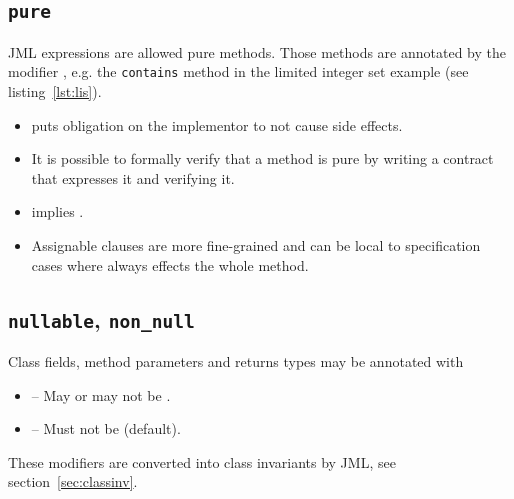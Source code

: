 		\subsection{\texttt{pure}}
		
			JML expressions are allowed pure methods. Those methods are annotated by the modifier , e.g. the \texttt{contains} method in the limited integer set example (see listing~\ref{lst:lis}).
			
			\begin{itemize}
				\item {} puts obligation on the implementor to not cause side effects.
				\item It is possible to formally verify that a method is pure by writing a contract that expresses it and verifying it.
				\item {} implies .
				\item Assignable clauses are more fine-grained and can be local to specification cases where  always effects the whole method.
			\end{itemize}

		\subsection{\texttt{nullable}, \texttt{non\_null}}
			Class fields, method parameters and returns types may be annotated with
			\begin{itemize}
				\item {} -- May or may not be .
				\item {}  -- Must not be  (default).
			\end{itemize}
			
			
			These modifiers are converted into class invariants by JML, see section~\ref{sec:classinv}.

